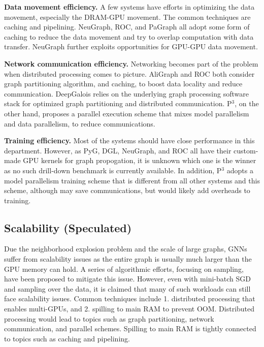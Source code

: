 \vspace{2mm}
\noindent \textbf{Data movement efficiency.}
A few systems have efforts in optimizing the data movement, especially the DRAM-GPU movement. The common techniques are caching and pipelining. NeuGraph, ROC, and PaGraph all adopt some form of caching to reduce the data movement and try to overlap computation with data transfer. NeuGraph further exploits opportunities for GPU-GPU data movement.

\vspace{2mm}
\noindent \textbf{Network communication efficiency.} Networking becomes part of the problem when distributed processing comes to picture. AliGraph and ROC both consider graph partitioning algorithm, and caching, to boost data locality and reduce communication. DeepGalois relies on the underlying graph processing software stack for optimized graph partitioning and distributed communication. P$^{3}$, on the other hand, proposes a parallel execution scheme that mixes model parallelism and data parallelism, to reduce communications.

\vspace{2mm}
\noindent \textbf{Training efficiency.} Most of the systems should have close performance in this department. However, as PyG, DGL, NeuGraph, and ROC all have their custom-made GPU kernels for graph propogation, it is unknown which one is the winner as no such drill-down benchmark is currently available. In addition, P$^3$ adopts a model parallelism training scheme that is different from all other systems and this scheme, although may save communications, but would likely add overheads to training.



\subsection{Scalability (Speculated)}
Due the neighborhood explosion problem and the scale of large graphs, GNNs suffer from scalability issues as the entire graph is usually much larger than the GPU memory can hold. A series of algorithmic efforts, focusing on sampling, have been proposed to mitigate this issue. However, even with mini-batch SGD and sampling over the data, it is claimed that many of such workloads can still face scalability issues. Common techniques include 1. distributed processing that enables multi-GPUs, and 2. spilling to main RAM to prevent OOM. Distributed processing would lead to topics such as graph partitioning, network communication, and parallel schemes. Spilling to main RAM is tightly connected to topics such as caching and pipelining.

